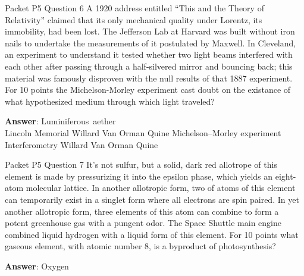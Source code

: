 \begin{frame}{Packet P5 Question 6}
A 1920 address entitled   ``This and the Theory of Relativity'' claimed that its only mechanical quality under Lorentz, its immobility, had been lost. The Jefferson Lab at Harvard was built   without iron nails to undertake the measurements of it postulated by Maxwell. In Cleveland, an experiment to understand it tested whether two light beams interfered with each other after passing through a half-silvered mirror and bouncing   back; this material was famously disproven with the null results of that 1887 experiment. For 10 points the Michelson-Morley   experiment cast     doubt on the existance of what hypothesized medium through   which light traveled?  

\textbf{Answer}: Luminiferous\ aether\\
 Lincoln Memorial
 Willard Van Orman Quine
 Michelson–Morley experiment
 Interferometry
 Willard Van Orman Quine
\end{frame}

\begin{frame}{Packet P5 Question 7}
It’s not sulfur, but a solid, dark red allotrope of this element   is made by pressurizing   it into the epsilon phase, which yields an eight-atom molecular lattice.   In another allotropic form, two of atoms of this element can temporarily exist in a singlet form where all electrons are spin paired. In yet   another allotropic form, three elements of this atom can combine to form a potent greenhouse gas with a pungent odor. The Space Shuttle main engine combined liquid hydrogen with a liquid form of this element. For 10 points what gaseous element, with atomic number 8, is a byproduct of photosynthesis?

\textbf{Answer}: Oxygen\\
\end{frame}


